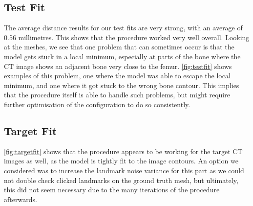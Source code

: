 \subsection{Test Fit}
The average distance results for our test fits are very strong, with an average of 0.56 millimetres. This shows that the procedure worked very well overall. Looking at the meshes, we see that one problem that can sometimes occur is that the model gets stuck in a local minimum, especially at parts of the bone where the CT image shows an adjacent bone very close to the femur. \autoref{fig:testfit} shows examples of this problem, one where the model was able to escape the local minimum, and one where it got stuck to the wrong bone contour. This implies that the procedure itself is able to handle such problems, but might require further optimisation of the configuration to do so consistently.

\subsection{Target Fit}
\autoref{fig:targetfit} shows that the procedure appears to be working for the target CT images as well, as the model is tightly fit to the image contours. An option we considered was to increase the landmark noise variance for this part as we could not double check clicked landmarks on the ground truth mesh, but ultimately, this did not seem necessary due to the many iterations of the procedure afterwards.
